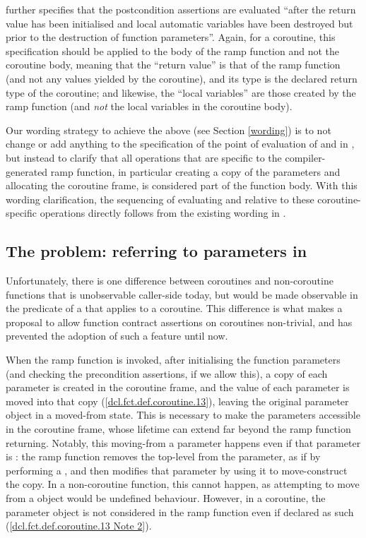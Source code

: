 \cite{P2900R8} further specifies that the postcondition assertions are evaluated ``after the return value has been initialised and local automatic variables have been destroyed but prior to the destruction of function parameters''. Again, for a coroutine, this specification should be applied to the body of the ramp function and not the coroutine body, meaning that the ``return value'' is that of the ramp function (and not any values yielded by the coroutine), and its type is the declared return type of the coroutine; and likewise, the ``local variables'' are those created by the ramp function (and \emph{not} the local variables in the coroutine body).

Our wording strategy to achieve the above (see Section \ref{wording}) is to not change or add anything to the specification of the point of evaluation of  and  in \cite{P2900R8}, but instead to clarify that all operations that are specific to the compiler-generated ramp function, in particular creating a copy of the parameters and allocating the coroutine frame, is considered part of the function body. With this wording clarification, the sequencing of evaluating  and  relative to these coroutine-specific operations directly follows from the existing wording in \cite{P2900R8}.

\subsection{The problem: referring to parameters in }
\label{paramsinpost}

Unfortunately, there is one difference between coroutines and non-coroutine functions that is unobservable caller-side today, but would be made observable in the predicate of a  that applies to a coroutine. This difference is what makes a proposal to allow function contract assertions on coroutines non-trivial, and has prevented the adoption of such a feature until now.

When the ramp function is invoked, after initialising the function parameters (and checking the precondition assertions, if we allow this), a copy of each parameter is created in the coroutine frame, and the value of each parameter is moved into that copy ([\href{https://eel.is/c++draft/dcl.fct.def.coroutine#13}{dcl.fct.def.coroutine.13}]), leaving the original parameter object in a moved-from state. This is necessary to make the parameters accessible in the coroutine frame, whose lifetime can extend far beyond the ramp function returning. Notably, this moving-from a parameter happens even if that parameter is : the ramp function removes the top-level  from the parameter, as if by performing a , and then modifies that parameter by using it to move-construct the copy. In a non-coroutine function, this cannot happen, as attempting to move from a  object would be undefined behaviour. However, in a coroutine, the parameter object is not considered  in the ramp function even if declared as such ([\href{https://eel.is/c++draft/dcl.fct.def.coroutine#note-2}{dcl.fct.def.coroutine.13 Note 2}]).

